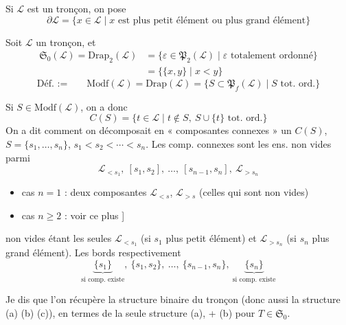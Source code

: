 \documentclass[11pt,a4paper]{article}
\begin{document}
Si $\mathcal{L}$ est un tronçon, on pose 
\[
  \partial \mathcal{L} = \{x \in \mathcal{L} \mid x \text{ est plus petit élément ou plus grand élément}\}
\]

Soit $\mathcal{L}$ un tronçon, et
\[
  \begin{aligned}
    \mathfrak{S}_0(\mathcal{L}) = \mathrm{Drap}_2(\mathcal{L}) &= \{\varepsilon \in \mathfrak{P}_2(\mathcal{L}) \mid \varepsilon \text{ totalement ordonné}\} \\
    &= \{\{x,y\} \mid x < y\}
  \end{aligned}
\]
\[
  \text{Déf. :=} \qquad \mathrm{Modf}(\mathcal{L}) = \mathrm{Drap}(\mathcal{L}) = \{S \subset \mathfrak{P}_f(\mathcal{L}) \mid S \text{ tot. ord.}\}
\]

Si $S \in \mathrm{Modf}(\mathcal{L})$, on a donc 
\[
  C(S) = \{t \in \mathcal{L} \mid t \notin S,\ S \cup \{t\} \text{ tot. ord.}\}
\]
On a dit comment on décomposait en « composantes connexes » un $C(S)$, $S = \{s_1, \ldots, s_n\}$, $s_1 < s_2 < \cdots < s_n$. Les comp. connexes sont les ens. non vides parmi
\[
  \mathcal{L}_{<s_1},\ [s_1, s_2],\ \ldots,\ [s_{n-1}, s_n],\ \mathcal{L}_{>s_n}
\]

\begin{itemize}
  \item[] [cas $n = 0$ : une seule comp. $\mathcal{L}$
  \item[] cas $n = 1$ :  deux composantes $\mathcal{L}_{<s}$, $\mathcal{L}_{>s}$ (celles qui sont non vides)
  \item[] cas $n \geq 2$ : voir ce  plus ]
\end{itemize}

\ill{} non vides  étant les seules \ill{} $\mathcal{L}_{<s_1}$ (si $s_1$ plus petit élément) et $\mathcal{L}_{>s_n}$ (si $s_n$ plus grand élément). Les bords  respectivement
\[
  \underbrace{\{s_1\}}_{\text{si comp. existe}},\ \{s_1, s_2\},\ \ldots,\ \{s_{n-1}, s_n\},\ \underbrace{\{s_n\}}_{\text{si comp. existe}}
\]

Je dis que l'on récupère la structure \struck{\ill{}} binaire du tronçon (donc aussi la structure (a) (b) (c)), en termes de la seule structure (a), + (b) pour $T \in \mathfrak{S}_0$.
\end{document}
